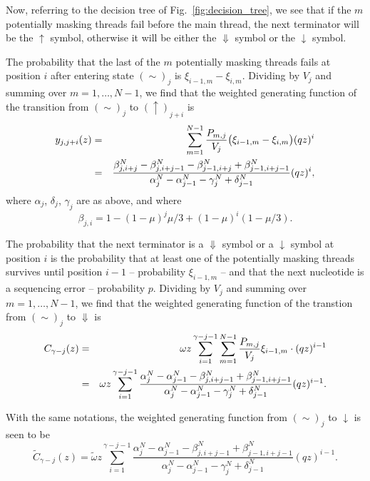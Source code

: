 \documentclass{article}
\begin{document}
Now, referring to the decision tree of Fig.~\ref{fig:decision_tree}, we
see that if the $m$ potentially masking threads fail before the main
thread, the next terminator will be the $\uparrow$ symbol, otherwise it
will be either the $\Downarrow$ symbol or the $\downarrow$ symbol.

The probability that the last of the $m$ potentially masking threads fails
at position $i$ after entering state $(\sim)_j$ is
$\xi_{i-1,m}-\xi_{i,m}$. Dividing by $V_j$ and summing over $m = 1,
\ldots, N-1$, we find that the weighted generating function of the
transition from $(\sim)_j$ to $(\uparrow)_{j+i}$ is
\begin{eqnarray}
y_{j,j+i}(z) &=& \sum_{m=1}^{N-1} \frac{P_{m,j}}{V_j}
\big( \xi_{i-1,m}-\xi_{i,m} \big) (qz)^i \notag \\
&=& \frac{\beta_{j,i+j}^N - \beta_{j,i+j-1}^N
-\beta_{j-1,i+j}^N + \beta_{j-1,i+j-1}^N}
  {\alpha_j^N-\alpha_{j-1}^N-\gamma_j^N+\delta_{j-1}^N} (qz)^i,
\end{eqnarray}
where $\alpha_j$, $\delta_j$, $\gamma_j$ are as above, and where
\begin{equation}
\beta_{j,i} = 1 - (1-\mu)^j\mu/3 + (1-\mu)^i(1-\mu/3).
\end{equation}

The probability that the next terminator is a $\Downarrow$ symbol or a
$\downarrow$ symbol at position $i$ is the probability that at least one
of the potentially masking threads survives until position $i-1$ --
probability $\xi_{i-1,m}$ -- and that the next nucleotide is a sequencing
error -- probability $p$. Dividing by $V_j$ and summing over $m = 1,
\ldots, N-1$, we find that the weighted generating function of the
transtion from $(\sim)_j$ to
$\Downarrow$ is
\begin{eqnarray}
C_{\gamma-j}(z) &=& \omega z \sum_{i=1}^{\gamma-j-1} \sum_{m=1}^{N-1}
  \frac{P_{m,j}}{V_j} \xi_{i-1,m} \cdot (qz)^{i-1} \notag \\
  &=& \omega z \sum_{i=1}^{\gamma-j-1}
\frac{ \alpha_j^N-\alpha_{j-1}^N-\beta_{j,i+j-1}^N
  +\beta_{j-1,i+j-1}^N }
{\alpha_j^N-\alpha_{j-1}^N-\gamma_j^N+\delta_{j-1}^N} (qz)^{i-1}.
\end{eqnarray}

With the same notations, the weighted generating function from $(\sim)_j$
to $\downarrow$ is seen to be 
\begin{equation}
\tilde{C}_{\gamma-j}(z) = \tilde{\omega} z \sum_{i=1}^{\gamma-j-1}
\frac{ \alpha_j^N-\alpha_{j-1}^N-\beta_{j,i+j-1}^N
  +\beta_{j-1,i+j-1}^N }
{\alpha_j^N-\alpha_{j-1}^N-\gamma_j^N+\delta_{j-1}^N} (qz)^{i-1}.
\end{equation}
\end{document}
